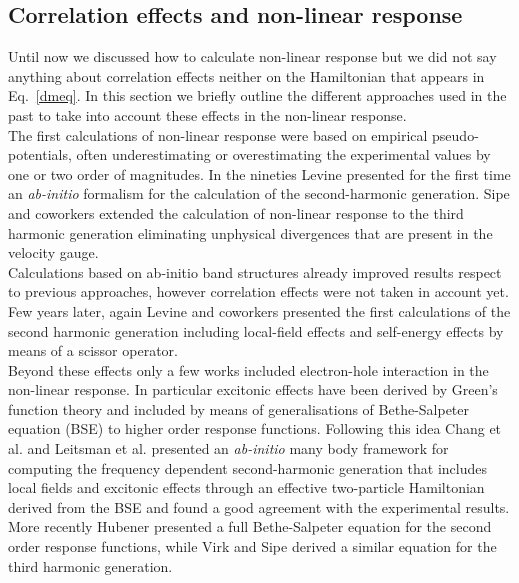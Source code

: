 \subsection{Correlation effects and non-linear response}
Until now we discussed how to calculate non-linear response but we did not say anything about correlation effects neither on the Hamiltonian that appears in Eq.~\ref{dmeq}. In this section we  briefly outline the different approaches used in the past to take into account these effects in the non-linear response.\\
The first calculations of non-linear response were based on empirical pseudo-potentials, often underestimating or overestimating the experimental values by one or two order of magnitudes.\cite{PhysRevB.12.2325,PhysRevB.36.9708}
In the nineties Levine\cite{PhysRevB.42.3567} presented for the first time an \emph{ab-initio} formalism for the calculation of the second-harmonic generation. Sipe and coworkers extended the calculation of non-linear response to the third harmonic generation eliminating  unphysical divergences that are present in the velocity gauge.\cite{PhysRevB.61.5337,PhysRevB.48.11705}\\ 
Calculations based on ab-initio band structures already improved results respect to previous approaches, however correlation effects were not taken in account yet. Few years later, again Levine and coworkers presented the first calculations of the second harmonic generation including local-field effects and self-energy effects by means of a scissor operator.\cite{PhysRevLett.63.1719,PhysRevB.56.1787} \\
Beyond these effects only a few works included electron-hole interaction in the non-linear response. In particular excitonic effects have been derived by Green's function theory and included by means of generalisations of Bethe-Salpeter equation (BSE)\cite{strinati} to higher order response functions. Following this idea Chang et al.\cite{Chang2002}  and Leitsman et al.\cite{Leitsmann2005} presented an \emph{ab-initio} many body framework for computing the frequency dependent second-harmonic generation that includes local fields and excitonic effects through an effective two-particle Hamiltonian derived from the BSE and found a good agreement with the experimental results.\\
More recently Hubener\cite{PhysRevA.83.062122} presented a full Bethe-Salpeter equation for the second order response functions, while Virk and Sipe derived a similar equation for the third harmonic generation.\cite{PhysRevB.56.1787}\\
